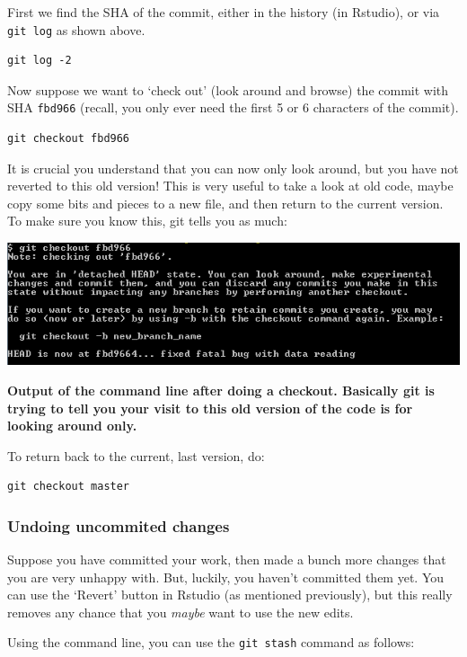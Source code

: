 \documentclass[]{book}
\begin{document}
First we find the SHA of the commit, either in the history (in Rstudio), or via \texttt{git\ log} as shown above.

\begin{verbatim}
git log -2
\end{verbatim}

Now suppose we want to `check out' (look around and browse) the commit with SHA \texttt{fbd966} (recall, you only ever need the first 5 or 6 characters of the commit).

\begin{verbatim}
git checkout fbd966
\end{verbatim}

It is crucial you understand that you can now only look around, but you have not reverted to this old version! This is very useful to take a look at old code, maybe copy some bits and pieces to a new file, and then return to the current version. To make sure you know this, git tells you as much:

\includegraphics[width=0.75\linewidth]{screenshots/gitcheckoutoutput}

\textbf{Output of the command line after doing a checkout. Basically git is trying to tell you your visit to this old version of the code is for looking around only.}

To return back to the current, last version, do:

\begin{verbatim}
git checkout master
\end{verbatim}

\hypertarget{undoing-uncommited-changes}{%
\subsubsection{Undoing uncommited changes}\label{undoing-uncommited-changes}}

Suppose you have committed your work, then made a bunch more changes that you are very unhappy with. But, luckily, you haven't committed them yet. You can use the `Revert' button in Rstudio (as mentioned previously), but this really removes any chance that you \emph{maybe} want to use the new edits.

Using the command line, you can use the \texttt{git\ stash} command as follows:
\end{document}
